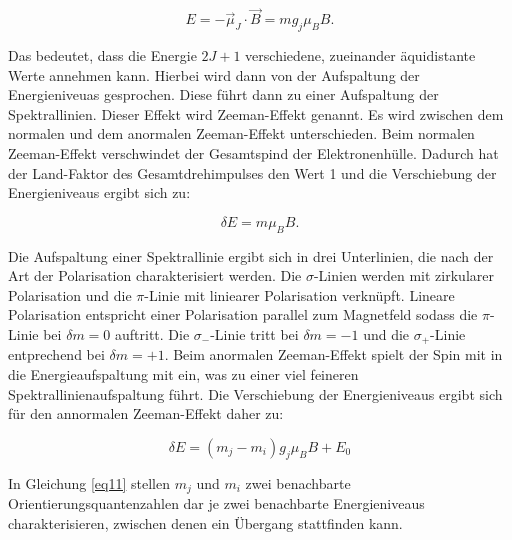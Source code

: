 \begin{equation}
    E = - \vec{\mu}_J \cdot \vec{B} = m g_j \mu_B B.
    \label{eq9}
\end{equation}

Das bedeutet, dass die Energie $2J+1$ verschiedene, zueinander 
äquidistante Werte annehmen kann. 
Hierbei wird dann von der Aufspaltung der Energieniveuas gesprochen. 
Diese führt dann zu einer Aufspaltung der Spektrallinien.
Dieser Effekt wird Zeeman-Effekt genannt.
Es wird zwischen dem normalen und dem anormalen Zeeman-Effekt unterschieden.
Beim normalen Zeeman-Effekt verschwindet der Gesamtspind der Elektronenhülle.
Dadurch hat der Land-Faktor des Gesamtdrehimpulses den Wert 1 und 
die Verschiebung der Energieniveaus ergibt sich zu:

\begin{equation}
    \delta E = m \mu_B B.
    \label{eq10}
\end{equation}

Die Aufspaltung einer Spektrallinie ergibt sich in drei Unterlinien,
die nach der Art der Polarisation charakterisiert werden. 
Die $\sigma$-Linien werden mit zirkularer Polarisation und die $\pi$-Linie 
mit liniearer Polarisation verknüpft. Lineare Polarisation entspricht einer Polarisation
parallel zum Magnetfeld sodass die $\pi$-Linie bei $\delta m = 0$ auftritt.
Die $\sigma_-$-Linie tritt bei $\delta m = -1$ und die $\sigma_+$-Linie entprechend 
bei $\delta m = +1$.
Beim anormalen Zeeman-Effekt spielt der Spin mit in die Energieaufspaltung mit 
ein, was zu einer viel feineren Spektrallinienaufspaltung führt. 
Die Verschiebung der Energieniveaus ergibt sich für den annormalen Zeeman-Effekt 
daher zu:

\begin{equation}
    \delta E = (m_j -m_i)g_j \mu_B B + E_0
    \label{eq11}
\end{equation}

In Gleichung \ref{eq11} stellen $m_j$ und $m_i$ zwei benachbarte Orientierungsquantenzahlen
dar je zwei benachbarte Energieniveaus charakterisieren, zwischen denen ein Übergang 
stattfinden kann.